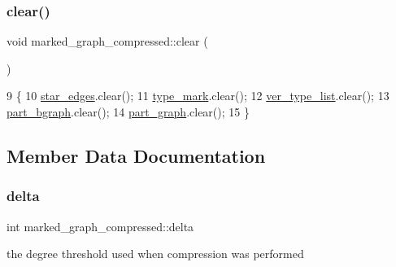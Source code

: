 \mbox{\label{classmarked__graph__compressed_af58307bfadcaa4c3ca6dd594c2f9b3a9}} 
\subsubsection{\texorpdfstring{clear()}{clear()}}
{\footnotesize\ttfamily void marked\+\_\+graph\+\_\+compressed\+::clear (\begin{DoxyParamCaption}{ }\end{DoxyParamCaption})}


\begin{DoxyCode}
9 \{
10   \hyperlink{classmarked__graph__compressed_a7df5779d313486644132bd816937f532}{star\_edges}.clear();
11   \hyperlink{classmarked__graph__compressed_a86b00223525703e973415cbc9c94da68}{type\_mark}.clear();
12   \hyperlink{classmarked__graph__compressed_af2e3e55223d436628a02758dfae88493}{ver\_type\_list}.clear();
13   \hyperlink{classmarked__graph__compressed_a7b3267063fba30b45eb21b3ba4e07536}{part\_bgraph}.clear();
14   \hyperlink{classmarked__graph__compressed_ae179a4737e6eab905c18a94d44ef64b7}{part\_graph}.clear();
15 \}
\end{DoxyCode}


\subsection{Member Data Documentation}
\mbox{\label{classmarked__graph__compressed_a8b2aaac68e9332ddc78d88eb60b323a7}} 
\subsubsection{\texorpdfstring{delta}{delta}}
{\footnotesize\ttfamily int marked\+\_\+graph\+\_\+compressed\+::delta}



the degree threshold used when compression was performed 

\mbox{\label{classmarked__graph__compressed_af6ff623407b673d08d0cab77b39c2193}} 
